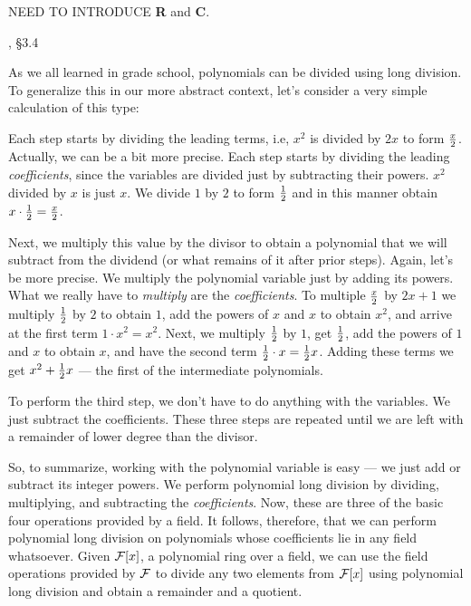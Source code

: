 NEED TO INTRODUCE {\bf R} and {\bf C}.

, \S3.4

As we all learned in grade school, polynomials can be divided
using long division.  To generalize this in our more abstract
context, let's consider a very simple calculation of this type:



Each step starts by dividing the leading terms, i.e, $x^2$ is divided
by $2x$ to form $x\over 2$.  Actually, we can be a bit more precise.
Each step starts by dividing the leading {\it coefficients},
since the variables are divided just by subtracting their
powers. $x^2$ divided by $x$ is just $x$.  We divide $1$ by $2$
to form $1\over2$ and in this manner obtain $x\cdot{1\over2}={x\over2}$.

Next, we multiply this value by the divisor to obtain a polynomial
that we will subtract from the dividend (or what remains of it after
prior steps).  Again, let's be more precise.  We multiply the
polynomial variable just by adding its powers.  What we really have to
{\it multiply} are the {\it coefficients}.  To multiple $x\over2$ by
$2x+1$ we multiply $1\over2$ by $2$ to obtain $1$, add the powers of
$x$ and $x$ to obtain $x^2$, and arrive at the first term $1\cdot
x^2=x^2$.  Next, we multiply $1\over2$ by $1$, get $1\over2$, add the
powers of $1$ and $x$ to obtain $x$, and have the second term
${1\over2}\cdot x={1\over2}x$.  Adding these terms we get
$x^2+{1\over2}x$ --- the first of the intermediate polynomials.

To perform the third step, we don't have to do anything with
the variables.  We just subtract the coefficients.  These
three steps are repeated until we are left with a remainder
of lower degree than the divisor.

So, to summarize, working with the polynomial variable is easy --- we
just add or subtract its integer powers.  We perform polynomial long
division by dividing, multiplying, and subtracting the {\it
coefficients}.  Now, these are three of the basic four operations
provided by a field.  It follows, therefore, that we can perform
polynomial long division on polynomials whose coefficients lie in any
field whatsoever.  Given ${\cal F}[x]$, a polynomial ring over a
field, we can use the field operations provided by ${\cal F}$ to
divide any two elements from ${\cal F}[x]$ using polynomial long
division and obtain a remainder and a quotient.


